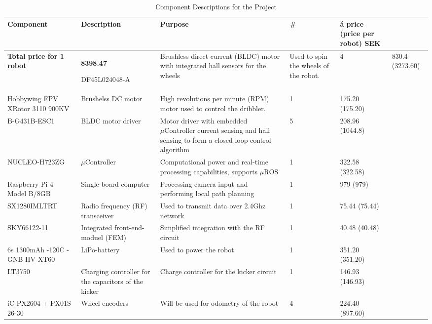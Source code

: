 \documentclass[a4paper,12pt]{article}
\begin{document}
\begin{centering}
\begin{longtable}{|p{3cm}|p{3cm}|p{3cm}|p{1cm}|p{2cm}| }
        \caption{Component Descriptions for the Project} \label{tab:component_bom} \\
        \hline
        \textbf{Component} & \textbf{Description} & \textbf{Purpose} & \textbf{\#} & \textbf{á price (price per robot) SEK}\\
        \endhead
        \hline

        \textbf{Total price for 1 robot} & \textbf{8398.47}
        \endlastfoot
        \hline

        DF45L024048-A & Brushless direct current (BLDC) motor with integrated hall sensors for the wheels & Used to spin the wheels of the robot. & 4 & 830.4 (3273.60)\\
        \hline
        Hobbywing FPV XRotor 3110 900KV & Brushelss DC motor & High revolutions per minute (RPM) motor used to control the dribbler. & 1 & 175.20 (175.20) \\
        \hline
        B-G431B-ESC1 & BLDC motor driver & Motor driver with embedded $\mu\text{Controller}$ current sensing and hall sensing to form a closed-loop control algorithm & 5 & 208.96 (1044.8) \\
        \hline
        NUCLEO-H723ZG & $\mu\text{Controller}$ & Computational power and real-time processing capabilities, supports $\mu\text{ROS}$ & 1 & 322.58 (322.58) \\
        \hline
        Raspberry Pi 4 Model B/8GB & Single-board computer & Processing camera input and performing local path planning & 1 & 979 (979) \\
        \hline
        SX1280IMLTRT & Radio frequency (RF) transceiver & Used to transmit data over 2.4Ghz network & 1 & 75.44 (75.44) \\
        \hline
        SKY66122-11 & Integrated front-end-moduel (FEM) & Simplified integration with the RF circuit & 1 & 40.48 (40.48) \\
        \hline
        6s 1300mAh -120C - GNB HV XT60 & LiPo-battery & Used to power the robot & 1 & 351.20 (351.20) \\
        \hline
        LT3750 & Charging controller for the capacitors of the kicker & Charge controller for the kicker circuit & 1 & 146.93 (146.93)\\
        \hline
        iC-PX2604 + PX01S 26-30 & Wheel encoders & Will be used for odometry of the robot & 4 & 224.40 (897.60) \\

\end{longtable}
\end{centering}
\end{document}
